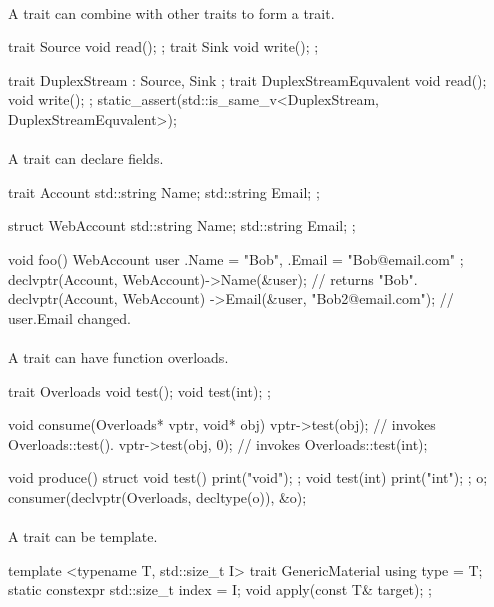 \documentclass{article}
\begin{document}
\paragraph{}
A trait can combine with other traits to form a trait.
\begin{codeblock}
trait Source{ void read(); };
trait Sink{ void write(); };

trait DuplexStream : Source, Sink {};
trait DuplexStreamEquvalent {
  void read();
  void write();
};
static_assert(std::is_same_v<DuplexStream, DuplexStreamEquvalent>);
\end{codeblock}

\paragraph{}
A trait can declare fields.
\begin{codeblock}
trait Account {
  std::string Name;
  std::string Email;
};

struct WebAccount {
  std::string Name;
  std::string Email;
};

void foo() {
  WebAccount user{ .Name = "Bob", .Email = "Bob@email.com" };
  declvptr(Account, WebAccount)->Name(&user); // returns "Bob".
  declvptr(Account, WebAccount)
    ->Email(&user, "Bob2@email.com"); // user.Email changed.
}
\end{codeblock}

\paragraph{}
A trait can have function overloads.

\begin{codeblock}
trait Overloads{
  void test();
  void test(int);
};

void consume(Overloads* vptr, void* obj) {
  vptr->test(obj); // invokes Overloads::test().
  vptr->test(obj, 0); // invokes Overloads::test(int);
}

void produce() {
  struct {
    void test() { print("void\n"); };
    void test(int) { print("int\n"); };
  } o;
  consumer(declvptr(Overloads, decltype(o)), &o);
}
\end{codeblock}

\paragraph{}
A trait can be template.
\begin{codeblock}
template <typename T, std::size_t I>
trait GenericMaterial {
  using type = T;
  static constexpr std::size_t index = I;
  void apply(const T& target);
};
\end{codeblock}
\end{document}
